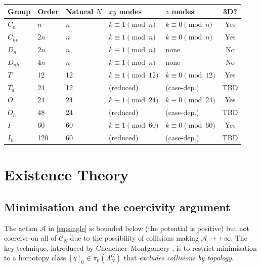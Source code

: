 \documentclass[12pt, a4paper]{article}
\theoremstyle{plain}
\theoremstyle{definition}
\newcommand{\Action}{\mathcal{A}}
\begin{document}
\begin{center}
\begin{tabular}{lllllc}
\toprule
\textbf{Group} & \textbf{Order} & \textbf{Natural $N$}
  & \textbf{$xy$ modes} & \textbf{$z$ modes}
  & \textbf{3D?} \\
\midrule
$C_n$   & $n$  & $n$  & $k \equiv 1 \pmod{n}$ & $k \equiv 0\pmod{n}$ & Yes \\
$C_{nv}$& $2n$ & $n$  & $k \equiv 1 \pmod{n}$ & $k \equiv 0\pmod{n}$ & Yes \\
$D_n$   & $2n$ & $n$  & $k \equiv 1 \pmod{n}$ & none                 & No  \\
$D_{nh}$& $4n$ & $n$  & $k \equiv 1 \pmod{n}$ & none                 & No  \\
$T$     & 12   & 12   & $k \equiv 1 \pmod{12}$& $k \equiv 0\pmod{12}$& Yes \\
$T_d$   & 24   & 12   & (reduced)             & (case-dep.)          & TBD \\
$O$     & 24   & 24   & $k \equiv 1 \pmod{24}$& $k \equiv 0\pmod{24}$& Yes \\
$O_h$   & 48   & 24   & (reduced)             & (case-dep.)          & TBD \\
$I$     & 60   & 60   & $k \equiv 1 \pmod{60}$& $k \equiv 0\pmod{60}$& Yes \\
$I_h$   & 120  & 60   & (reduced)             & (case-dep.)          & TBD \\
\bottomrule
\end{tabular}
\end{center}

\section{Existence Theory}

\subsection{Minimisation and the coercivity argument}

The action $\Action$ in \eqref{eq:single} is bounded below (the
potential is positive) but not coercive on all of $\mathcal{C}_N$
due to the possibility of collisions making $\Action \to +\infty$.
The key technique, introduced by Chenciner--Montgomery \cite{CM2000},
is to restrict minimisation to a homotopy class $[\gamma]_0 \in
\pi_0(\Lambda_N^G)$ that \emph{excludes collisions by topology}.
\end{document}
